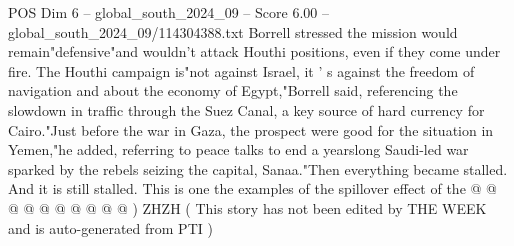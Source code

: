 \begin{textsample}{POS Dim 6 – global\_south\_2024\_09 – Score 6.00 – global\_south\_2024\_09/114304388.txt}
Borrell stressed the mission would remain"defensive"and wouldn't attack Houthi positions, even if they come under fire.
The Houthi campaign is"not against Israel, it ' s against the freedom of navigation and about the economy of Egypt,"Borrell said, referencing the slowdown in traffic through the Suez Canal, a key source of hard currency for Cairo."Just before the war in Gaza, the prospect were good for the situation in Yemen,"he added, referring to peace talks to end a yearslong Saudi-led war sparked by the rebels seizing the capital, Sanaa."Then everything became stalled.
And it is still stalled.
This is one the examples of the spillover effect of the @ @ @ @ @ @ @ @ @ @ ) ZHZH ( This story has not been edited by THE WEEK and is auto-generated from PTI )

\end{textsample}
